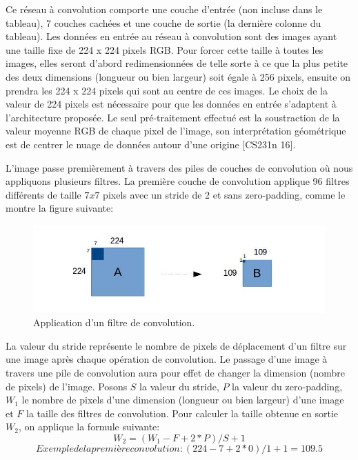 	Ce réseau à convolution comporte une couche d'entrée (non incluse dans le tableau), 7 couches cachées et une couche de sortie (la dernière colonne du tableau). Les données en entrée au réseau à convolution sont des images ayant une taille fixe de 224 x 224 pixels RGB. Pour forcer cette taille à toutes les images, elles seront d'abord redimensionnées de telle sorte à ce que la plus petite des deux dimensions (longueur ou bien largeur) soit égale à 256 pixels, ensuite on prendra les 224 x 224 pixels qui sont au centre de ces images. Le choix de la valeur de 224 pixels est nécessaire pour que les données en entrée s'adaptent à l'architecture proposée. Le seul pré-traitement effectué est la soustraction de la valeur moyenne RGB de chaque pixel de l'image, son interprétation géométrique est de centrer le nuage de données autour d'une origine [CS231n 16].

	L'image passe premièrement à travers des piles de couches de convolution où nous appliquons plusieurs filtres. La première couche de convolution applique 96 filtres différents de taille $7x7$ pixels avec un stride de 2 et sans zero-padding, comme le montre la figure suivante:

\begin{figure}[H]
	\centering
		\includegraphics[width=7.5in]{Figures/conv.jpg}
	\caption[An Electron]{Application d'un filtre de convolution.}
	\label{fig:Electron}
\end{figure}

	La valeur du stride représente le nombre de pixels de déplacement d'un filtre sur une image après chaque opération de convolution. Le passage d'une image à travers une pile de convolution aura pour effet de changer la dimension (nombre de pixels) de l'image. Posons $S$ la valeur du stride, $P$ la valeur du zero-padding, $W_{1}$ le nombre de pixels d'une dimension (longueur ou bien largeur) d'une image et $F$ la taille des filtres de convolution. Pour calculer la taille obtenue en sortie $W_{2}$, on applique la formule suivante:
$$W_{2} = (W_{1} - F + 2*P)/S + 1$$
$$Exemple de la première convolution: (224 - 7 + 2*0)/1 +1 = 109.5$$
	
